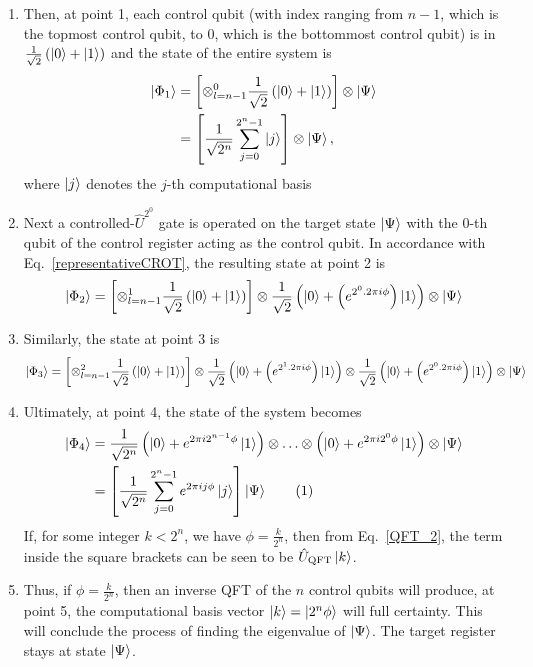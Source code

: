 \documentclass[12pt,oneside]{book}
\newcommand\numberthis{\addtocounter{equation}{1}\tag{\theequation}}
\begin{document}
\begin{enumerate}
    \item Then, at point 1, each control qubit (with index ranging from $n-1$, which is the topmost control qubit, to 0, which is the bottommost control qubit) is in $\frac{1}{\sqrt{2}}\left(\ket{0}+\ket{1}\right)$ and the state of the entire system is
    \begin{align*}
        \ket{\Phi_1}&{}=\left[\otimes_{l=n-1}^{0}\frac{1}{\sqrt{2}}\left(\ket{0}+\ket{1}\right)\right]\otimes\ket{\Psi}\\
        &{}=\left[\frac{1}{\sqrt{2^n}}\sum_{j=0}^{2^n-1}\ket{j}\right]\otimes\ket{\Psi},
    \end{align*}
    where $\ket{j}$ denotes the $j$-th computational basis
    \item Next a controlled-$\hat{U}^{2^0}$ gate is operated on the target state $\ket{\Psi}$ with the $0$-th qubit of the control register acting as the control qubit. In accordance with Eq.~\ref{representativeCROT}, the resulting state at point 2 is
    \begin{align*}
        \ket{\Phi_2}=\left[\otimes_{l=n-1}^{1}\frac{1}{\sqrt{2}}\left(\ket{0}+\ket{1}\right)\right] \otimes \frac{1}{\sqrt{2}}\left(\ket{0}+\left(e^{2^0 . 2\pi i \phi}\right)\ket{1}\right) \otimes \ket{\Psi}
    \end{align*}
    \item Similarly, the state at point 3 is
    \begin{align*}
        \ket{\Phi_3}=\left[\otimes_{l=n-1}^{2}\frac{1}{\sqrt{2}}\left(\ket{0}+\ket{1}\right)\right] \otimes \frac{1}{\sqrt{2}}\left(\ket{0}+\left(e^{2^1 . 2\pi i \phi}\right)\ket{1}\right) \otimes \frac{1}{\sqrt{2}}\left(\ket{0}+\left(e^{2^0 . 2\pi i \phi}\right)\ket{1}\right) \otimes \ket{\Psi}
    \end{align*}
    \item Ultimately, at point 4, the state of the system becomes
    \begin{align*}\label{QPE_4}
        \ket{\Phi_4}&{}= \frac{1}{\sqrt{2^n}}\left(\ket{0}+e^{2\pi i 2^{n-1}\phi}\ket{1}\right)\otimes\hdots\otimes \left(\ket{0}+e^{2\pi i 2^0\phi}\ket{1}\right)\otimes \ket{\Psi}\\
        &{}= \left[\frac{1}{\sqrt{2^n}} \sum_{j=0}^{2^n-1}e^{2\pi i j \phi}\ket{j}\right]\ket{\Psi}\numberthis
    \end{align*}
    If, for some integer $k<2^n$, we have $\phi=\frac{k}{2^n}$, then from Eq.~\ref{QFT_2}, the term inside the square brackets can be seen to be $\hat{U}_{\mathrm{QFT}}\ket{k}$.
    \item Thus, if $\phi=\frac{k}{2^n}$, then an inverse QFT of the $n$ control qubits will produce, at point 5, the computational basis vector $\ket{k}=\ket{2^n\phi}$ will full certainty. This will conclude the process of finding the eigenvalue of $\ket{\Psi}$. The target register stays at state $\ket{\Psi}$.


\end{enumerate}
\end{document}
